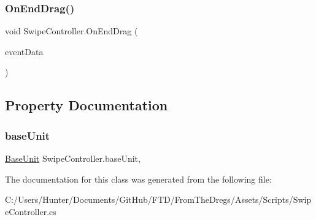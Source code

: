 \subsubsection{\texorpdfstring{OnEndDrag()}{OnEndDrag()}}
{\footnotesize\ttfamily void Swipe\+Controller.\+On\+End\+Drag (\begin{DoxyParamCaption}\item[{Pointer\+Event\+Data}]{event\+Data }\end{DoxyParamCaption})}



\subsection{Property Documentation}
\mbox{\label{class_swipe_controller_a422f7e579179be4a1e6e198d97068cc2}} 
\subsubsection{\texorpdfstring{baseUnit}{baseUnit}}
{\footnotesize\ttfamily \mbox{\hyperlink{class_base_unit}{Base\+Unit}} Swipe\+Controller.\+base\+Unit\hspace{0.3cm}{\ttfamily [get]}, {\ttfamily [set]}}



The documentation for this class was generated from the following file\+:\begin{DoxyCompactItemize}
\item 
C\+:/\+Users/\+Hunter/\+Documents/\+Git\+Hub/\+F\+T\+D/\+From\+The\+Dregs/\+Assets/\+Scripts/Swipe\+Controller.\+cs\end{DoxyCompactItemize}
